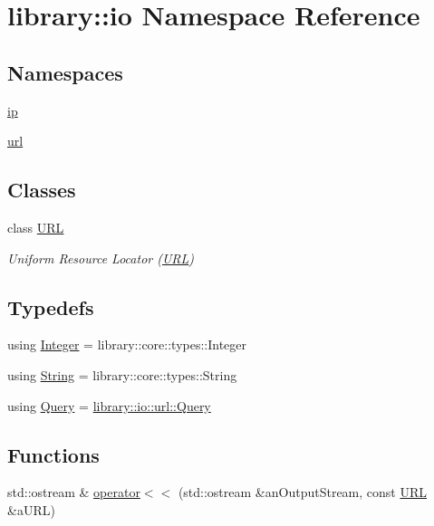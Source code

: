 \hypertarget{namespacelibrary_1_1io}{}\section{library\+:\+:io Namespace Reference}
\label{namespacelibrary_1_1io}
\subsection*{Namespaces}
\begin{DoxyCompactItemize}
\item 
 \hyperlink{namespacelibrary_1_1io_1_1ip}{ip}
\item 
 \hyperlink{namespacelibrary_1_1io_1_1url}{url}
\end{DoxyCompactItemize}
\subsection*{Classes}
\begin{DoxyCompactItemize}
\item 
class \hyperlink{classlibrary_1_1io_1_1_u_r_l}{U\+RL}
\begin{DoxyCompactList}\small\item\em Uniform Resource Locator (\hyperlink{classlibrary_1_1io_1_1_u_r_l}{U\+RL}) \end{DoxyCompactList}\end{DoxyCompactItemize}
\subsection*{Typedefs}
\begin{DoxyCompactItemize}
\item 
using \hyperlink{namespacelibrary_1_1io_a0a929bf9e177597c2e92073d200dda53}{Integer} = library\+::core\+::types\+::\+Integer
\item 
using \hyperlink{namespacelibrary_1_1io_a7469b45835a4421045db344d6a5a1f85}{String} = library\+::core\+::types\+::\+String
\item 
using \hyperlink{namespacelibrary_1_1io_a39ebaf2265de78ba79eb5347f2af61b3}{Query} = \hyperlink{classlibrary_1_1io_1_1url_1_1_query}{library\+::io\+::url\+::\+Query}
\end{DoxyCompactItemize}
\subsection*{Functions}
\begin{DoxyCompactItemize}
\item 
std\+::ostream \& \hyperlink{namespacelibrary_1_1io_a36e00c0130e6908cc64fe2f7941f2652}{operator$<$$<$} (std\+::ostream \&an\+Output\+Stream, const \hyperlink{classlibrary_1_1io_1_1_u_r_l}{U\+RL} \&a\+U\+RL)
\end{DoxyCompactItemize}


